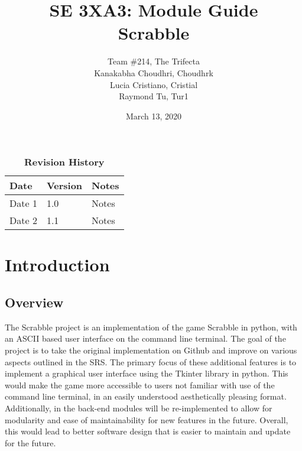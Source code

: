 \documentclass[12pt, titlepage]{article}
\title{SE 3XA3: Module Guide \\ Scrabble}
\author{Team \#214, The Trifecta
		\\ Kanakabha Choudhri, Choudhrk
		\\ Lucia Cristiano, Cristial
		\\ Raymond Tu, Tur1
}
\date{March 13, 2020}
\begin{document}
\maketitle

\tableofcontents
\listoftables
\listoffigures

\begin{table}[bp]
\caption{\bf Revision History}
\begin{tabularx}{\textwidth}{p{3cm}p{2cm}X}
\toprule {\bf Date} & {\bf Version} & {\bf Notes}\\
\midrule
Date 1 & 1.0 & Notes\\
Date 2 & 1.1 & Notes\\
\bottomrule
\end{tabularx}
\end{table}

\newpage


\section{Introduction} %

\subsection{Overview}

The Scrabble project is an implementation of the game Scrabble in python, with an ASCII based user interface on the command line terminal. The goal of the project is to take the original implementation on Github and improve on various aspects outlined in the SRS. The primary focus of these additional features is to implement a graphical user interface using the Tkinter library in python. This would make the game more accessible to users not familiar with use of the command line terminal, in an easily understood aesthetically pleasing format. Additionally, in the back-end modules will be re-implemented to allow for modularity and ease of maintainability for new features in the future. Overall, this would lead to better software design that is easier to maintain and update for the future. 
\end{document}
